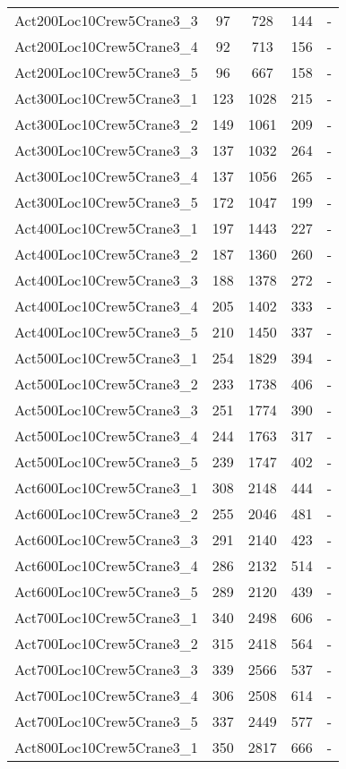 \begin{center}
\begin{longtable}{ | l | c | c | c | c | }
Act200Loc10Crew5Crane3\_3	&	97	&	728	&	144	& -\\
Act200Loc10Crew5Crane3\_4	&	92	&	713	&	156	& -\\
Act200Loc10Crew5Crane3\_5	&	96	&	667	&	158	& -\\
Act300Loc10Crew5Crane3\_1	&	123	&	1028	&	215 & -	\\
Act300Loc10Crew5Crane3\_2	&	149	&	1061	&	209	& -\\
Act300Loc10Crew5Crane3\_3	&	137	&	1032	&	264	& -\\
Act300Loc10Crew5Crane3\_4	&	137	&	1056	&	265	& -\\
Act300Loc10Crew5Crane3\_5	&	172	&	1047	&	199	& -\\
Act400Loc10Crew5Crane3\_1	&	197	&	1443	&	227	& -\\
Act400Loc10Crew5Crane3\_2	&	187	&	1360	&	260	& -\\
Act400Loc10Crew5Crane3\_3	&	188	&	1378	&	272	& -\\
Act400Loc10Crew5Crane3\_4	&	205	&	1402	&	333	& -\\
Act400Loc10Crew5Crane3\_5	&	210	&	1450	&	337	& -\\
Act500Loc10Crew5Crane3\_1	&	254	&	1829	&	394	& -\\
Act500Loc10Crew5Crane3\_2	&	233	&	1738	&	406	& -\\
Act500Loc10Crew5Crane3\_3	&	251	&	1774	&	390	& -\\
Act500Loc10Crew5Crane3\_4	&	244	&	1763	&	317	& -\\
Act500Loc10Crew5Crane3\_5	&	239	&	1747	&	402	& -\\
Act600Loc10Crew5Crane3\_1	&	308	&	2148	&	444	& -\\
Act600Loc10Crew5Crane3\_2	&	255	&	2046	&	481	& -\\
Act600Loc10Crew5Crane3\_3	&	291	&	2140	&	423	& -\\
Act600Loc10Crew5Crane3\_4	&	286	&	2132	&	514	& -\\
Act600Loc10Crew5Crane3\_5	&	289	&	2120	&	439	& -\\
Act700Loc10Crew5Crane3\_1	&	340	&	2498	&	606	& -\\
Act700Loc10Crew5Crane3\_2	&	315	&	2418	&	564	& -\\
Act700Loc10Crew5Crane3\_3	&	339	&	2566	&	537	& -\\
Act700Loc10Crew5Crane3\_4	&	306	&	2508	&	614	& -\\
Act700Loc10Crew5Crane3\_5	&	337	&	2449	&	577	& -\\
Act800Loc10Crew5Crane3\_1	&	350	&	2817	&	666	& -\\

\end{longtable}
\end{center}
